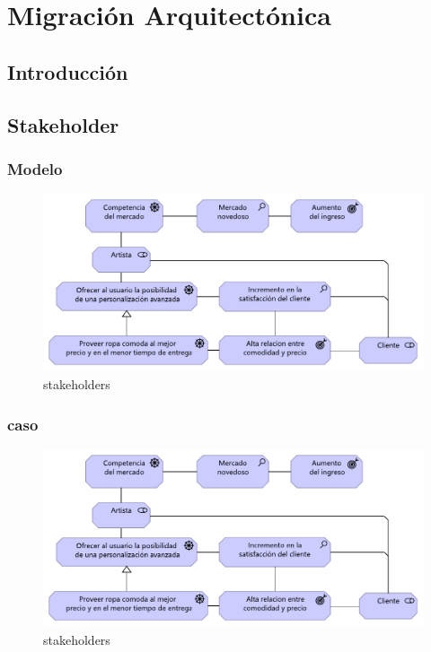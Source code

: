 \graphicspath{{./2-Arquitectura/capitulo8/}}

\chapter{Migración Arquitectónica}
\section{Introducción}
\newpage
\section{Stakeholder}
\subsection{Modelo}
\begin{figure}[h!]
	\centering
	\includegraphics[width=0.7\linewidth]{imgs/stakeholders}
	\caption{stakeholders}
	\label{fig:stakeholders}
\end{figure}
\newpage
\subsection{caso}
\begin{figure}[h!]
	\centering
	\includegraphics[width=0.7\linewidth]{imgs/stakeholders}
	\caption{stakeholders}
	\label{fig:stakeholders}
\end{figure}
\newpage